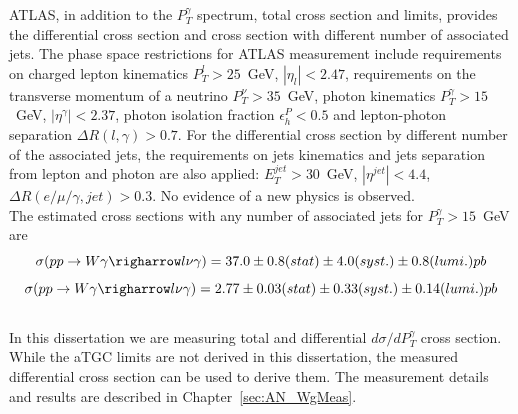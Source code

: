 ATLAS, in addition to the $P_T^\gamma$ spectrum, total cross section and limits, provides the differential cross section and cross section with different number of associated jets. The phase space restrictions for ATLAS measurement include requirements on charged lepton kinematics $P_T^l>25$~GeV, $|\eta_l|<2.47$, requirements on the transverse momentum of a neutrino $P_T^\nu>35$~GeV, photon kinematics $P_T^\gamma>15$~GeV, $|\eta^\gamma|<2.37$, photon isolation fraction $\epsilon^P_h<0.5$ and lepton-photon separation $\Delta R(l,\gamma)>0.7$. For the differential cross section by different number of the associated jets, the requirements on jets kinematics and jets separation from lepton and photon are also applied: $E_T^{jet}>30$~GeV, $|\eta^{jet}|<4.4$, $\Delta R(e/\mu/\gamma,jet)>0.3$. No evidence of a new physics is observed.\\

The estimated cross sections with any number of associated jets for $P_T^\gamma>15$~GeV are 
\begin{equation}
\sigma(pp\rightarrow W\gamma\righarrow l\nu\gamma) = 37.0 \pm 0.8 (stat) \pm 4.0 (syst.) \pm 0.8 (lumi.) pb 
\end{equation}
\begin{equation}
\sigma(pp\rightarrow W\gamma\righarrow l\nu\gamma) = 2.77 \pm 0.03 (stat) \pm 0.33 (syst.) \pm 0.14 (lumi.) pb
\end{equation}
\\

In this dissertation we are measuring total and differential $d\sigma/d P_T^\gamma$ cross section. While the aTGC limits are not derived in this dissertation, the measured differential cross section can be used to derive them. The measurement details and results are described in Chapter~\ref{sec:AN_WgMeas}.\\
